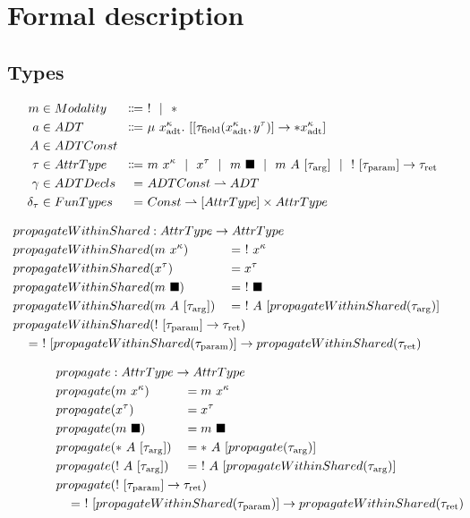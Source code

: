 \chapter{Formal description}\label{sec:theory}

\newcommand{\sep}{\ \ |\ \ }

\section{Types}
\begin{alignat*}{2}
  m &\in Modality &\Coloneqq&\ ! \sep * \\
  a &\in ADT &\Coloneqq&\ \mu\ x^\kappa_\text{adt}.\ [[\tau_\text{field}(x^\kappa_\text{adt}, y^\tau)] \to *x^\kappa_\text{adt}] \\
  A &\in \mathrlap{ADTConst} \\
  \tau &\in AttrType &\Coloneqq&\ m\ x^\kappa \sep x^\tau \sep m\ \blacksquare \sep m\ A\ [\tau_\text{arg}] \sep !\ [\tau_\text{param}] \to \tau_\text{ret} \\
  \gamma &\in ADTDecls &=&\ ADTConst \rightharpoonup ADT \\
  \delta_\tau &\in FunTypes &=&\ Const \rightharpoonup [AttrType] \times AttrType
\end{alignat*}

\begin{alignat*}{3}
  propagateWithinShared &: \mathrlap{AttrType \to AttrType} \\
  propagateWithinShared&(m\ x^\kappa) &&=\ !\ x^\kappa \\
  propagateWithinShared&(x^\tau) &&= x^\tau \\
  propagateWithinShared&(m\ \blacksquare) &&=\ !\ \blacksquare \\
  propagateWithinShared&(m\ A\ [\tau_\text{arg}]) &&=\ !\ A\ [propagateWithinShared(\tau_\text{arg})] \\
  propagateWithinShared&\mathrlap{(!\ [\tau_\text{param}] \to \tau_\text{ret})} \\
  \mathclap{\hspace{12em}= \ !\ [propagateWithinShared(\tau_\text{param})] \to propagateWithinShared(\tau_\text{ret})}
\end{alignat*}

\begin{alignat*}{3}
  propagate &: \mathrlap{AttrType \to AttrType} \\
  propagate&(m\ x^\kappa) &&= m\ x^\kappa \\
  propagate&(x^\tau) &&= x^\tau \\
  propagate&(m\ \blacksquare) &&= m\ \blacksquare \\
  propagate&(*\ A\ [\tau_\text{arg}]) &&= *\ A\ [propagate(\tau_\text{arg})] \\
  propagate&(!\ A\ [\tau_\text{arg}]) &&= \ !\ A\ [propagateWithinShared(\tau_\text{arg})] \\
  propagate&\mathrlap{(!\ [\tau_\text{param}] \to \tau_\text{ret})} \\
  \mathclap{\hspace{25em}= \ !\ [propagateWithinShared(\tau_\text{param})] \to propagateWithinShared(\tau_\text{ret})}
\end{alignat*}

